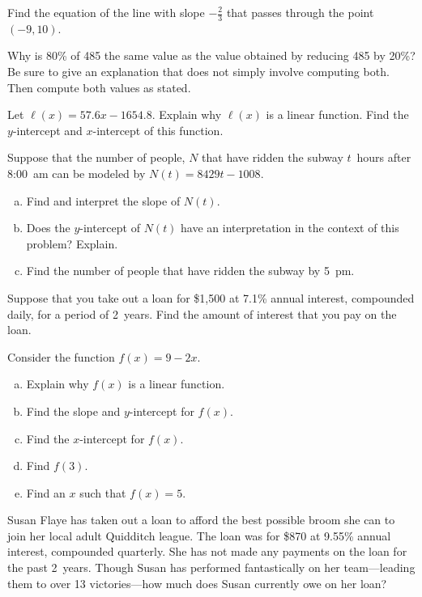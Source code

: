 \documentclass[11pt,letterpaper]{article}
\begin{document}
\prob Find the equation of the line with slope $-\frac{2}{3}$ that passes through the point $(-9 ,10)$. \pspace 


\prob Why is 80\% of 485 the same value as the value obtained by reducing 485 by 20\%? Be sure to give an explanation that does not simply involve computing both. Then compute both values as stated. \pspace 


\prob Let $\ell(x)= 57.6x - 1654.8$. Explain why $\ell(x)$ is a linear function. Find the $y$-intercept and $x$-intercept of this function. \pspace


\prob Suppose that the number of people, $N$ that have ridden the subway $t$~hours after 8:00~am can be modeled by $N(t)= 8429t - 1008$. 
	\begin{enumerate}[(a)]
	\item Find and interpret the slope of $N(t)$.
	\item Does the $y$-intercept of $N(t)$ have an interpretation in the context of this problem? Explain.
	\item Find the number of people that have ridden the subway by 5~pm. 
	\end{enumerate} \pspace


\prob Suppose that you take out a loan for \$1,500 at 7.1\% annual interest, compounded daily, for a period of 2~years. Find the amount of interest that you pay on the loan. \pspace 


\prob Consider the function $f(x)= 9 - 2x$. 
	\begin{enumerate}[(a)]
	\item Explain why $f(x)$ is a linear function. 
	\item Find the slope and $y$-intercept for $f(x)$. 
	\item Find the $x$-intercept for $f(x)$. 
	\item Find $f(3)$. 
	\item Find an $x$ such that $f(x)= 5$. 
	\end{enumerate} \pspace


\prob Susan Flaye has taken out a loan to afford the best possible broom she can to join her local adult Quidditch league. The loan was for \$870 at 9.55\% annual interest, compounded quarterly. She has not made any payments on the loan for the past 2~years. Though Susan has performed fantastically on her team---leading them to over 13 victories---how much does Susan currently owe on her loan? \pspace	
\end{document}

